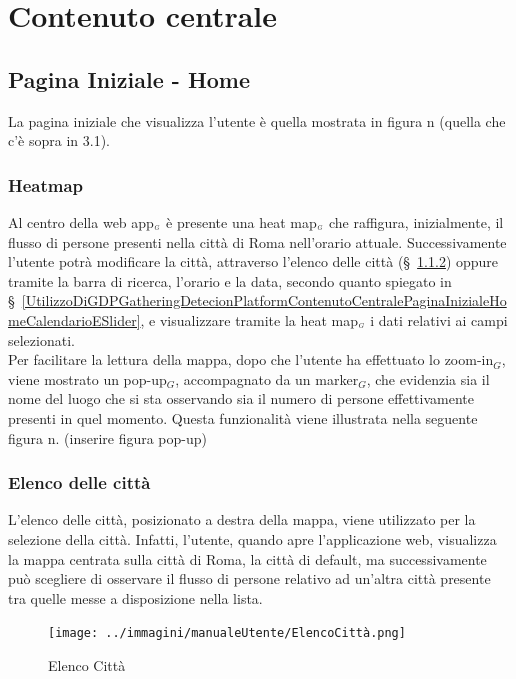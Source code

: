 \section{Contenuto centrale}\label{UtilizzoDiGDPGatheringDetecionPlatformContenutoCentrale}

\subsection{Pagina Iniziale - Home} \label{UtilizzoDiGDPGatheringDetecionPlatformContenutoCentralePaginaInizialeHome}
La pagina iniziale che visualizza l'utente è quella mostrata in figura n (quella che c'è sopra in 3.1). 


\subsubsection{Heatmap}\label{UtilizzoDiGDPGatheringDetecionPlatformContenutoCentralePaginaInizialeHomeHeatmap}
Al centro della web app$_{\scaleto{G}{3pt}}$ è presente una heat map$_{\scaleto{G}{3pt}}$ che raffigura, inizialmente, il flusso di persone presenti nella città di Roma nell'orario attuale. Successivamente l'utente potrà modificare la città, attraverso l'elenco delle città (\S~\ref{UtilizzoDiGDPGatheringDetecionPlatformContenutoCentralePaginaInizialeHomeMenùATendina}) oppure tramite la barra di ricerca, l'orario e la data, secondo quanto spiegato in \S~\ref{UtilizzoDiGDPGatheringDetecionPlatformContenutoCentralePaginaInizialeHomeCalendarioESlider}, e visualizzare tramite la heat map$_{\scaleto{G}{3pt}}$ i dati relativi ai campi selezionati.\\
Per facilitare la lettura della mappa, dopo che l'utente ha effettuato lo zoom-in$_G$, viene mostrato un pop-up$_G$, accompagnato da un marker$_G$, che evidenzia sia il nome del luogo che si sta osservando sia il numero di persone effettivamente presenti in quel momento. Questa funzionalità viene illustrata nella seguente figura n. (inserire figura pop-up)

\subsubsection{Elenco delle città} \label{UtilizzoDiGDPGatheringDetecionPlatformContenutoCentralePaginaInizialeHomeMenùATendina}
L'elenco delle città, posizionato a destra della mappa, viene utilizzato per la selezione della città. Infatti, l'utente, quando apre l'applicazione web, visualizza la mappa centrata sulla città di Roma, la città di default, ma successivamente può scegliere di osservare il flusso di persone relativo ad un'altra città presente tra quelle messe a disposizione nella lista. 
\begin{center}
	\begin{figure}
		\texttt{[image: ../immagini/manualeUtente/ElencoCittà.png]}
		\caption{Elenco Città}
	\end{figure}
\end{center}

